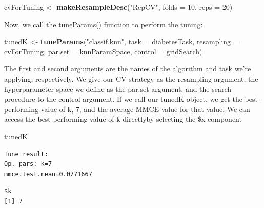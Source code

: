 \documentclass[
]{article}
\newenvironment{Shaded}{\begin{snugshade}}{\end{snugshade}}
\newcommand{\AttributeTok}[1]{\textcolor[rgb]{0.13,0.29,0.53}{#1}}
\newcommand{\DecValTok}[1]{\textcolor[rgb]{0.00,0.00,0.81}{#1}}
\newcommand{\FunctionTok}[1]{\textcolor[rgb]{0.13,0.29,0.53}{\textbf{#1}}}
\newcommand{\NormalTok}[1]{#1}
\newcommand{\OtherTok}[1]{\textcolor[rgb]{0.56,0.35,0.01}{#1}}
\newcommand{\SpecialCharTok}[1]{\textcolor[rgb]{0.81,0.36,0.00}{\textbf{#1}}}
\newcommand{\StringTok}[1]{\textcolor[rgb]{0.31,0.60,0.02}{#1}}
\begin{document}
\begin{Shaded}
\begin{Highlighting}[]
\NormalTok{cvForTuning }\OtherTok{\textless{}{-}} \FunctionTok{makeResampleDesc}\NormalTok{(}\StringTok{"RepCV"}\NormalTok{, }\AttributeTok{folds =} \DecValTok{10}\NormalTok{, }\AttributeTok{reps =} \DecValTok{20}\NormalTok{)}
\end{Highlighting}
\end{Shaded}

Now, we call the tuneParams() function to perform the tuning:

\begin{Shaded}
\begin{Highlighting}[]
\NormalTok{tunedK }\OtherTok{\textless{}{-}} \FunctionTok{tuneParams}\NormalTok{(}\StringTok{"classif.knn"}\NormalTok{, }\AttributeTok{task =}\NormalTok{ diabetesTask,}
                     \AttributeTok{resampling =}\NormalTok{ cvForTuning,}
                     \AttributeTok{par.set =}\NormalTok{ knnParamSpace, }\AttributeTok{control =}\NormalTok{ gridSearch)}
\end{Highlighting}
\end{Shaded}

The first and second arguments are the names of the algorithm and task
we're applying, respectively. We give our CV strategy as the resampling
argument, the hyperparameter space we define as the par.set argument,
and the search procedure to the control argument. If we call our tunedK
object, we get the best-performing value of k, 7, and the average MMCE
value for that value. We can access the best-performing value of k
directlyby selecting the \$x component

\begin{Shaded}
\begin{Highlighting}[]
\NormalTok{tunedK}
\end{Highlighting}
\end{Shaded}

\begin{verbatim}
Tune result:
Op. pars: k=7
mmce.test.mean=0.0771667
\end{verbatim}

\begin{Shaded}
\end{Shaded}

\begin{verbatim}
$k
[1] 7
\end{verbatim}
\end{document}
